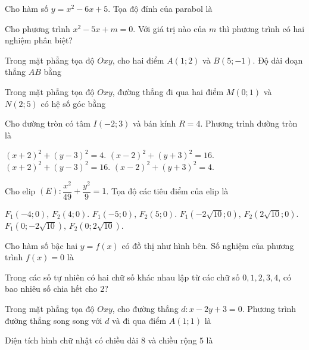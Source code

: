 
\NQuestion Cho hàm số $y=x^2-6x+5$. Tọa độ đỉnh của parabol là


\NQuestion Cho phương trình $x^2-5x+m=0$. Với giá trị nào của $m$ thì phương trình có hai nghiệm phân biệt?


\NQuestion Trong mặt phẳng tọa độ $Oxy$, cho hai điểm $A(1;2)$ và $B(5;-1)$. Độ dài đoạn thẳng $AB$ bằng


\NQuestion Trong mặt phẳng tọa độ $Oxy$, đường thẳng đi qua hai điểm $M(0;1)$ và $N(2;5)$ có hệ số góc bằng


\NQuestion Cho đường tròn có tâm $I(-2;3)$ và bán kính $R=4$. Phương trình đường tròn là

\ChoicesTwoLines
{$(x+2)^2+(y-3)^2=4$.}
{$(x-2)^2+(y+3)^2=16$.}
{$(x+2)^2+(y-3)^2=16$.}
{$(x-2)^2+(y+3)^2=4$.}

\NQuestion Cho elip $(E):\dfrac{x^2}{49}+\dfrac{y^2}{9}=1$. Tọa độ các tiêu điểm của elip là

\ChoicesTwoLines
{$F_1(-4;0),\,F_2(4;0)$.}
{$F_1(-5;0),\,F_2(5;0)$.}
{$F_1(-2\sqrt{10};0),\,F_2(2\sqrt{10};0)$.}
{$F_1(0;-2\sqrt{10}),\,F_2(0;2\sqrt{10})$.}

\NQuestion Cho hàm số bậc hai $y=f\left(x\right)$ có đồ thị như hình bên. Số nghiệm của phương trình $f\left(x\right)=0$ là

\begin{center}

\end{center}


\NQuestion Trong các số tự nhiên có hai chữ số khác nhau lập từ các chữ số $0,1,2,3,4$, có bao nhiêu số chia hết cho $2$?


\NQuestion Trong mặt phẳng tọa độ $Oxy$, cho đường thẳng $d: x-2y+3=0$. Phương trình đường thẳng song song với $d$ và đi qua điểm $A(1;1)$ là


\NQuestion Diện tích hình chữ nhật có chiều dài $8$ và chiều rộng $5$ là

